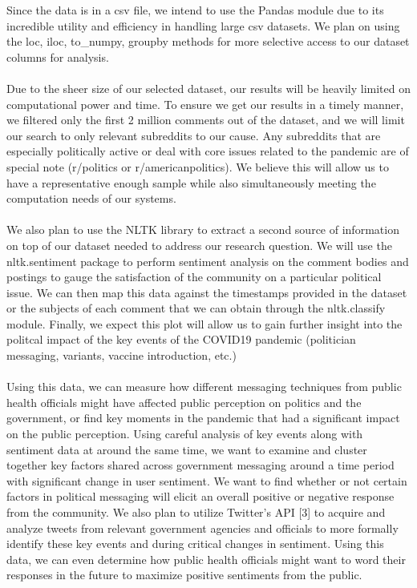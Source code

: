 \documentclass[fontsize=11pt]{article}
\begin{document}
Since the data is in a csv file, we intend to use the Pandas module due to its incredible utility and efficiency in handling large csv datasets. We plan on using the loc, iloc, to\_numpy, groupby methods for more selective access to our dataset columns for analysis.
\\\\
Due to the sheer size of our selected dataset, our results will be heavily limited on computational power and time. To ensure we get our results in a timely manner, we filtered only the first 2 million comments out of the dataset, and we will limit our search to only relevant subreddits to our cause. Any subreddits that are especially politically active or deal with core issues related to the pandemic are of special note (r/politics or r/americanpolitics). We believe this will allow us to have a representative enough sample while also simultaneously meeting the computation needs of our systems.
\\\\
We also plan to use the NLTK library to extract a second source of information on top of our dataset needed to address our research question. We will use the nltk.sentiment package to perform sentiment analysis on the comment bodies and postings to gauge the satisfaction of the community on a particular political issue. We can then map this data against the timestamps provided in the dataset or the subjects of each comment that we can obtain through the nltk.classify module. Finally, we expect this plot will allow us to gain further insight into the politcal impact of the key events of the COVID19 pandemic (politician messaging, variants, vaccine introduction, etc.)
\\\\
Using this data, we can measure how different messaging techniques from public health officials might have affected public perception on politics and the government, or find key moments in the pandemic that had a significant impact on the public perception. Using careful analysis of key events along with sentiment data at around the same time, we want to examine and cluster together key factors shared across government messaging around a time period with significant change in user sentiment. We want to find whether or not certain factors in political messaging will elicit an overall positive or negative response from the community. We also plan to utilize Twitter’s API [3] to acquire and analyze tweets from relevant government agencies and officials to more formally identify these key events and during critical changes in sentiment. Using this data, we can even determine how public health officials might want to word their responses in the future to maximize positive sentiments from the public.
\end{document}
